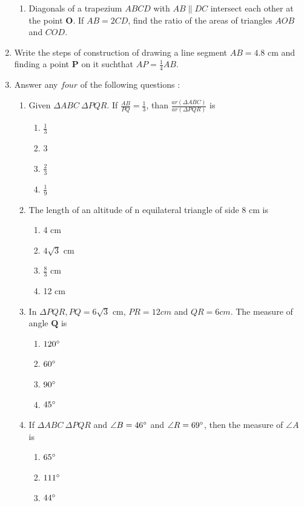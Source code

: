 \documentclass{article}
\let\vec\mathbf
\begin{document}
\begin{enumerate}
\begin{enumerate}
			\item Diagonals of a trapezium $ ABCD $ with $ AB \parallel DC $ intersect each other at 
				the point $ \vec{O} $. If $ AB =2 CD $, find the ratio of the areas of triangles 
				$ AOB $ and $ COD $. 
		\end{enumerate}
	\item Write the steps of construction of drawing a line segment $ AB = 4.8 $ cm and finding a point 
		$ \vec{P} $ on it suchthat $ AP = \frac{1}{4} AB $. 
	\item Answer any $ four $ of the following questions : 
		\begin{enumerate}
		\item Given $ \Delta ABC ~ \Delta PQR $. If $ \frac{AB}{PQ} = \frac{1}{3} $, than 
			$ \frac{ar(\Delta ABC)}{ar(\Delta PQR)} $ is
			\begin{enumerate}
			\item $ \frac{1}{3} $
			\item 3
			\item $ \frac{2}{3} $
			\item $ \frac{1}{9} $
			\end{enumerate}
		\item The length of an altitude of n equilateral triangle of side 8 cm is
			\begin{enumerate}
				\item 4 cm
				\item $ 4\sqrt{3} $ cm
				\item $ \frac{8}{3} $ cm
				\item 12 cm
			\end{enumerate}
		\item In $ \Delta PQR, PQ = 6 \sqrt{3} $ cm, $ PR = 12 cm $ and $ QR = 6 cm $. The measure of 
			angle $ \vec{Q} $ is
			\begin{enumerate}
		\item $ 120{\degree} $
		\item $ 60{\degree} $
		\item $ 90{\degree} $
		\item $ 45{\degree} $
			\end{enumerate}
		\item If $ \Delta ABC ~ \Delta PQR $ and $ \angle{B} =46{\degree} $ and $ \angle{R} = 69{\degree}
			 $, then the measure of $ \angle{A} $ is
				\begin{enumerate}
					\item $ 65{\degree} $
					\item $ 111{\degree} $
					\item $ 44{\degree} $

\end{enumerate}
\end{enumerate}
\end{enumerate}
\end{document}
